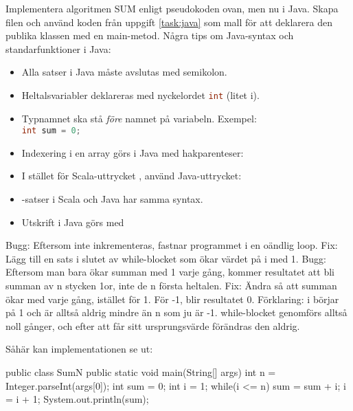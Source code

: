 \Subtask Implementera algoritmen SUM enligt pseudokoden ovan, men nu i Java. Skapa filen  och använd koden från uppgift \ref{task:java} som mall för att deklarera den publika klassen  med en main-metod. Några tips om Java-syntax och standarfunktioner i Java:

\begin{itemize}%
\item Alla satser i Java måste avslutas med semikolon.
\item Heltalsvariabler deklareras med nyckelordet \lstinline[language=Java]{int} (litet i).
\item Typnamnet ska stå \emph{före} namnet på variabeln. Exempel: \\ \lstinline[language=Java]{int sum = 0;}
\item Indexering i en array görs i Java med hakparenteser: 
\item I stället för Scala-uttrycket , använd Java-uttrycket: \\ 
\item {}-satser i Scala och Java har samma syntax.
\item Utskrift i Java görs med 
\end{itemize}


\SOLUTION


\TaskSolved \what


\SubtaskSolved  Bugg: Eftersom  inte inkrementeras, fastnar programmet i en oändlig loop. Fix: Lägg till en sats i slutet av while-blocket som ökar värdet på i med 1.
Bugg: Eftersom man bara ökar summan med 1 varje gång, kommer resultatet att bli summan av n stycken 1or, inte de n första heltalen. Fix: Ändra så att summan ökar med  varje gång, istället för 1.
För -1, blir resultatet 0. Förklaring: i börjar på 1 och är alltså aldrig mindre än n som ju är -1. while-blocket genomförs alltså noll gånger, och efter att  får sitt ursprungsvärde förändras den aldrig.


\SubtaskSolved  Såhär kan implementationen se ut:
\begin{Code}[language=Java]
public class SumN {
  public static void main(String[] args) {
    int n = Integer.parseInt(args[0]);
    int sum = 0;
    int i = 1;
    while(i <= n){
      sum = sum + i;
      i = i + 1;
      }
    }
    System.out.println(sum);
}
\end{Code}

